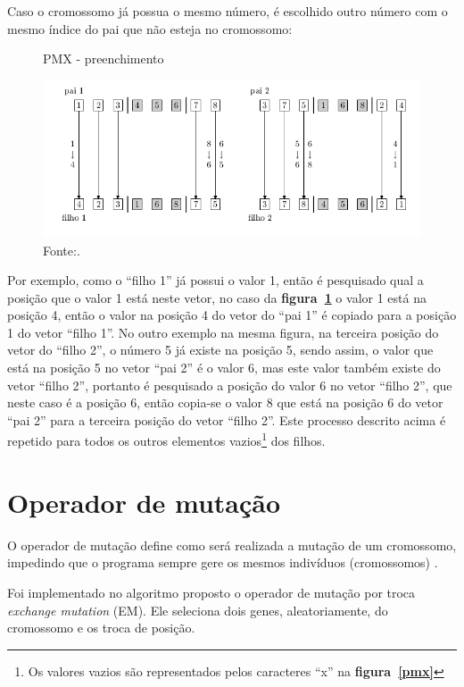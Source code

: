 \documentclass[12pt,openright,a4paper,oneside]{tcc}
\begin{document}
	   		Caso o cromossomo já possua o mesmo número, é escolhido outro número com o mesmo índice do pai que não esteja no cromossomo:
	   		\begin{figure}[h]
				\centering
                \caption{PMX - preenchimento}
		        \includegraphics[width = 14cm,keepaspectratio]{img/pmx2.png}		        
		        \caption*{Fonte:\cite{0012-pdf}.}
		        \label{pmx2}
	   		\end{figure}

	   		Por exemplo, como o ``filho 1'' já possui o valor 1, então é pesquisado qual a posição que o valor 1 está neste vetor, no caso da \textbf{figura~\ref{pmx2}} o valor 1 está na posição 4, então o valor na posição 4 do vetor do ``pai 1'' é copiado para a posição 1 do vetor ``filho 1''. No outro exemplo na mesma figura, na terceira posição do vetor do ``filho 2'',  o número 5 já existe na posição 5, sendo assim, o valor que está na posição 5 no vetor ``pai 2'' é o valor 6, mas este valor também existe do vetor ``filho 2'', portanto é pesquisado a posição do valor 6 no vetor ``filho 2'', que neste caso é a posição 6, então copia-se o valor 8 que está na posição 6 do vetor ``pai 2'' para a terceira posição do vetor ``filho 2''. 
	   		Este processo descrito acima é repetido para todos os outros elementos vazios\footnote{Os valores vazios são representados pelos caracteres ``x'' na \textbf{figura~\ref{pmx}}} dos filhos.
	   		  
		\section{Operador de mutação}
			\label{Sem}
			O operador de mutação define como será realizada a mutação de um cromossomo, impedindo que o programa sempre gere os mesmos indivíduos (cromossomos) \cite{0012-pdf}.

			Foi implementado no algoritmo proposto o operador de mutação por troca \textit{exchange mutation} (EM). Ele seleciona dois genes, aleatoriamente, do cromossomo e os troca de posição.
\end{document}
